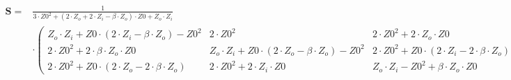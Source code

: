 $\begin{alignedat}{1}\mathbf{S}= & \frac{1}{3\cdot Z0^2+\left(2\cdot
Z_o+2\cdot Z_i-\beta\cdot Z_o\right)\cdot Z0+Z_o\cdot Z_i}\\ & \cdot
\left(\begin{smallmatrix} Z_o\cdot Z_i+Z0\cdot \left(2\cdot
Z_i-\beta\cdot Z_o\right)-Z0^2 & 2\cdot Z0^2 & 2\cdot Z0^2+2\cdot
Z_o\cdot Z0 \\ 2\cdot Z0^2+2\cdot \beta\cdot Z_o\cdot Z0 & Z_o\cdot
Z_i+Z0\cdot \left(2\cdot Z_o-\beta\cdot Z_o\right)-Z0^2 & 2\cdot
Z0^2+Z0\cdot \left(2\cdot Z_i-2\cdot \beta\cdot Z_o\right) \\ 2\cdot
Z0^2+Z0\cdot \left(2\cdot Z_o-2\cdot \beta\cdot Z_o\right) & 2\cdot
Z0^2+2\cdot Z_i\cdot Z0 & Z_o\cdot Z_i-Z0^2+\beta\cdot Z_o\cdot Z0
\end{smallmatrix}\right)\end{alignedat}$
